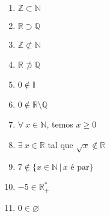 \documentclass[a4paper, 12pt]{article}
\begin{document}
\begin{enumerate}
     \begin{enumerate}
         \item $\mathbb{Z} \subset \mathbb{N}$ %
         \item $\mathbb{R} \supset \mathbb{Q}$ %
         \item $\mathbb{Z} \not\subset \mathbb{N}$ %
         \item $\mathbb{R} \not\supset \mathbb{Q}$ %
         \item $0 \not\in \mathbb{I}$ %
         \item $0 \not\in \mathbb{R} \setminus \mathbb{Q}$ %
         \item $\forall \ x \in \mathbb{N}$, temos $x \geq 0$ %
         \item $\exists \ x \in \mathbb{R}$ tal que $\sqrt{x} \not\in \mathbb{R}$ %
         \item $7 \not\in \{x \in \mathbb{N} \,|\, x \textrm{ é par}\}$ %
         \item $-5 \in \mathbb{R}^*_+$
         \item $0 \in \varnothing$ %
         
     \end{enumerate}
     
\end{enumerate}
\end{document}
